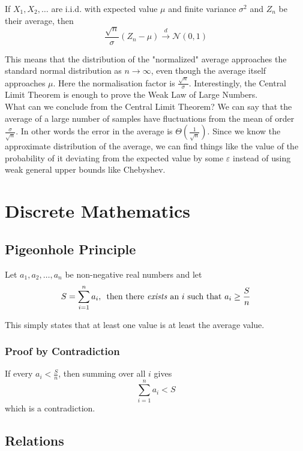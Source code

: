 If \(X_1,X_2,\dots\) are i.i.d. with expected value \(\mu\) and finite variance \(\sigma^2\) and $Z_n$ be their average, 
then
\[
\frac{\sqrt{n}}{\sigma} \left(Z_n-\mu\right) \xrightarrow{d} \mathcal{N}(0,1)
\]

This means that the distribution of the "normalized" average approaches the standard normal distribution 
as \(n\to\infty\), even though the average itself approaches \(\mu\). Here the normalisation factor is 
$\frac{\sqrt{n}}{\sigma}$. Interestingly, the Central Limit Theorem 
is enough to prove the Weak Law of Large Numbers.\\


\noindent What can we conclude from the Central Limit Theorem? We can say that the average 
of a large number of samples have fluctuations from the mean of order $\frac{\sigma}{\sqrt{n}}$. 
In other words the error in the average is $\Theta(\frac{1}{\sqrt{n}})$. Since we know the approximate 
distribution of the average, we can find things like the value of the probability of it deviating 
from the expected value by some $\varepsilon$ instead of using weak general upper bounds like Chebyshev.
\chapter{Discrete Mathematics}

\section{Pigeonhole Principle}
\label{pigeonhole_principle}

Let \(a_1,a_2,\dots,a_n\) be non-negative real numbers and let
\[
S=\sum_{i=1}^{n}a_i,\hspace{0.5em} \text{then there \emph{exists} an $i$ such that }a_i \ge \frac{S}{n}
\]

This simply states that at least one value is at least the average value.

\subsection*{Proof by Contradiction}

If every \(a_i < \frac{S}{n}\), then summing over all \(i\) gives
\[
\sum_{i=1}^{n} a_i < S
\]
which is a contradiction.



\section{Relations}

